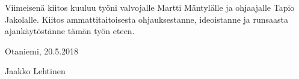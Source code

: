 \documentclass[finnish,12pt,a4paper,pdftex]{article}
\begin{document}
\noindent Viimeisenä kiitos kuuluu työni valvojalle Martti Mäntylälle ja ohjaajalle Tapio Jakolalle. Kiitos ammattitaitoisesta ohjauksestanne, ideoistanne ja runsaasta ajankäytöstänne tämän työn eteen.

\vspace{5cm}
Otaniemi, 20.5.2018

\vspace{5mm}
{\hfill Jaakko Lehtinen \hspace{1cm}}

\newpage


\thesistableofcontents


\end{document}
